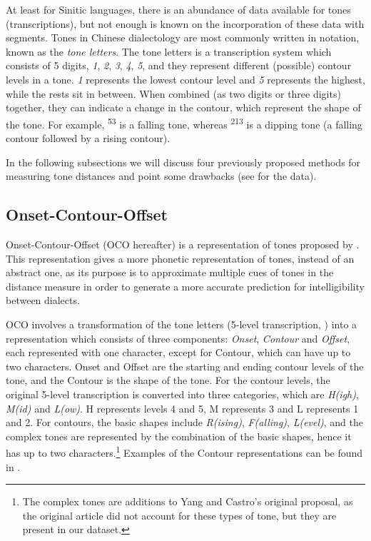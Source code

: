 \documentclass[output=paper, chinesefont]{langscibook}
\begin{document}
At least for Sinitic languages, there is an abundance of data available for tones (transcriptions), but not enough is known on the incorporation of these data with segments. Tones in Chinese dialectology are most commonly written in  notation, known as the \textit{tone letters}. The tone letters is a transcription system which consists of 5 digits, \textit{1}, \textit{2}, \textit{3}, \textit{4}, \textit{5}, and they represent different (possible) contour levels in a tone. \textit{1} represents the lowest contour level and \textit{5} represents the highest, while the rests sit in between. When combined (as two digits or three digits) together, they can indicate a change in the contour, which represent the shape of the tone. For example, \textsuperscript{53} is a falling tone, whereas \textsuperscript{213} is a dipping tone (a falling contour followed by a rising contour).

In the following subsections we will discuss four previously proposed methods for measuring tone distances and point some drawbacks (see  for the data).

\subsection{Onset-Contour-Offset}
\label{sec:sung:3.2}
Onset-Contour-Offset (OCO hereafter) is a representation of tones proposed by \citet{YangCastro2008}. This representation gives a more phonetic representation of tones, instead of an abstract one, as its purpose is to approximate multiple cues of tones in the distance measure in order to generate a more accurate prediction for intelligibility between dialects. 

OCO involves a transformation of the tone letters (5-level transcription, \citealt{Chao1930}) into a representation which consists of three components: \textit{Onset}, \textit{Contour} and \textit{Offset}, each represented with one character, except for Contour, which can have up to two characters. Onset and Offset are the starting and ending contour levels of the tone, and the Contour is the shape of the tone. For the contour levels, the original 5-level transcription is converted into three categories, which are \textit{H(igh)}, \textit{M(id)} and \textit{L(ow)}. H represents levels 4 and 5, M represents 3 and L represents 1 and 2. For contours, the basic shapes include \textit{R(ising)}, \textit{F(alling)}, \textit{L(evel)}, and the complex tones are represented by the combination of the basic shapes, hence it has up to two characters.\footnote{The complex tones are additions to Yang and Castro’s original proposal, as the original article did not account for these types of tone, but they are present in our dataset.} Examples of the Contour representations can be found in .
\end{document}
